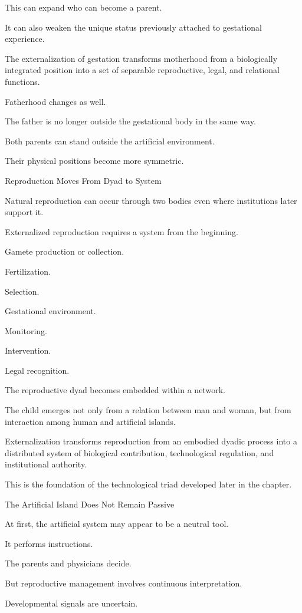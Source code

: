 This can expand who can become a parent.

It can also weaken the unique status previously attached to gestational experience.

The externalization of gestation transforms motherhood from a biologically integrated position into a set of separable reproductive, legal, and relational functions.

Fatherhood changes as well.

The father is no longer outside the gestational body in the same way.

Both parents can stand outside the artificial environment.

Their physical positions become more symmetric.

Reproduction Moves From Dyad to System

Natural reproduction can occur through two bodies even where institutions later support it.

Externalized reproduction requires a system from the beginning.

Gamete production or collection.

Fertilization.

Selection.

Gestational environment.

Monitoring.

Intervention.

Legal recognition.

The reproductive dyad becomes embedded within a network.

The child emerges not only from a relation between man and woman, but from interaction among human and artificial islands.

Externalization transforms reproduction from an embodied dyadic process into a distributed system of biological contribution, technological regulation, and institutional authority.

This is the foundation of the technological triad developed later in the chapter.

The Artificial Island Does Not Remain Passive

At first, the artificial system may appear to be a neutral tool.

It performs instructions.

The parents and physicians decide.

But reproductive management involves continuous interpretation.

Developmental signals are uncertain.

